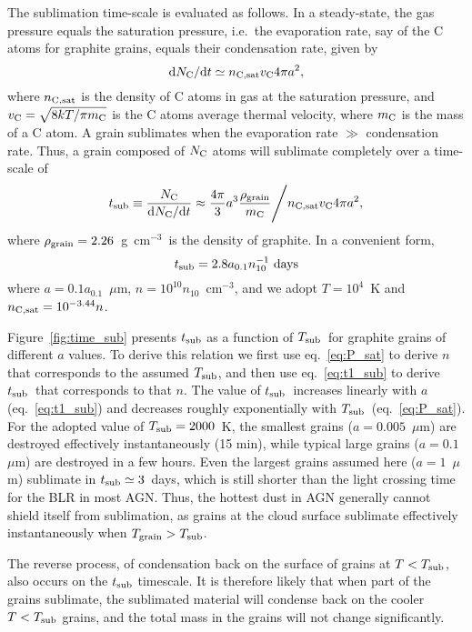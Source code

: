 \documentclass[a4paper,fleqn,usenatbib]{mnras}
\newcommand{\cmt}{cm$^{-3}$}
\newcommand{\dd}{\textrm{d}}
\newcommand{\mic}{\mbox{$\mu$m}}
\newcommand{\Tsub}{\mbox{$T_{\rm sub}$}}
\newcommand{\tsub}{\mbox{$t_{\rm sub}$}}
\newcommand{\Tgr}{\mbox{$T_{\rm grain}$}}
\begin{document}
The sublimation time-scale is evaluated as follows. In a steady-state, the gas pressure equals the saturation pressure, i.e.\ the evaporation rate, say of the C atoms for graphite grains, equals their condensation rate, given by
\begin{equation}
\dd N_{\rm C} / \dd t \simeq n_{\rm C,sat} v_{\rm C} 4\pi a^2,
\end{equation}
where $n_{\rm C,sat}$ is the density of C atoms in gas at the saturation pressure,
and $v_{\rm C}=\sqrt{8kT/\pi m_{\rm C}}$ is the C atoms average thermal velocity, where $m_{\rm C}$ is the mass of a C atom. A grain sublimates when the evaporation rate $\gg$  condensation rate. Thus, a grain composed of $N_{\rm C}$ atoms will 
sublimate completely over a time-scale of
\begin{equation}
\tsub\equiv \frac{N_{\rm C}}{\dd N_{\rm C} / \dd t}  \approx \frac{4\pi}{3}a^3 \frac{\rho_{\rm grain}}{m_{\rm C}} \Bigg/  n_{\rm C,sat} v_{\rm C} 4\pi a^2, \label{eq:t_sub}
\end{equation}
where  $\rho_{\rm grain}=2.26$~g~\cmt\ is the density of graphite. 
In a convenient form, 
\begin{equation}
\tsub= 2.8 a_{0.1}n_{10}^{-1} ~{\rm days}
\label{eq:t1_sub}
\end{equation}
where $a=0.1a_{0.1}$~\mic, $n=10^{10}n_{10}$~\cmt, and we adopt $T=10^4$~K and $n_{\rm C,sat}=10^{-3.44}n$.  

Figure~\ref{fig:time_sub} presents $\tsub$ as a function of \Tsub\ for graphite grains of different
$a$ values. To derive this relation we first use eq.~\ref{eq:P_sat} to derive $n$ that corresponds to the 
assumed \Tsub, and then use eq.~\ref{eq:t1_sub} to derive \tsub\ that corresponds to that 
$n$.
The value of \tsub\ increases linearly with $a$ (eq.~\ref{eq:t1_sub}) and decreases roughly exponentially with \Tsub\ (eq.~\ref{eq:P_sat}). For the adopted value of $\Tsub=2000$~K, the smallest grains ($a=0.005$~\mic) are destroyed effectively instantaneously (15 min), while typical large grains ($a=0.1$~\mic) are destroyed in a 
few hours. Even the largest grains assumed here ($a=1$~\mic) sublimate in $\tsub\simeq 3$~days,  which is 
still shorter than the light crossing time for the BLR in most AGN. Thus, the hottest dust in AGN generally cannot shield itself from sublimation, as grains at the cloud surface sublimate 
effectively instantaneously when $\Tgr>\Tsub$.

The reverse process, of condensation back on the surface of grains at $T<\Tsub$, also occurs on the $\tsub$ 
timescale. It is therefore likely that when part of the grains sublimate, the sublimated material will condense
back on the cooler $T<\Tsub$ grains, and the total mass in the grains will not change significantly.	
	
\end{document}
